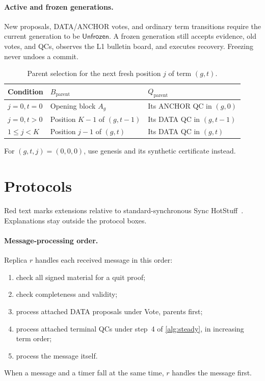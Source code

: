 \documentclass[11pt,a4paper]{article}
\newcommand{\RR}[1]{{\color{rrRed}#1}}
\newcommand{\tagg}[1]{\ensuremath{\mathsf{#1}}}
\newcounter{protocol}
\begin{document}
\paragraph{Active and frozen generations.}
New proposals, DATA/ANCHOR votes, and ordinary term transitions require
the current generation to be \tagg{Unfrozen}. A frozen generation still
accepts evidence, old votes, and QCs, observes the L1 bulletin board, and
executes recovery. Freezing never undoes a commit.

\begin{table}[htbp]\centering\small
\caption{Parent selection for the next fresh position $j$ of term $(g,t)$.}
\label{tab:parent}
\begin{tabularx}{\linewidth}{@{}l Y Y@{}}
\toprule
Condition & $B_{\mathrm{parent}}$ & $Q_{\mathrm{parent}}$\\
\midrule
$j=0,t=0$ & Opening block $A_g$ & Its ANCHOR QC in $(g,0)$\\
$j=0,t>0$ & Position $K-1$ of $(g,t-1)$ & Its DATA QC in $(g,t-1)$\\
$1\le j<K$ & Position $j-1$ of $(g,t)$ & Its DATA QC in $(g,t)$\\
\bottomrule
\end{tabularx}
\smallskip
For $(g,t,j)=(0,0,0)$, use genesis and its synthetic certificate instead.
\end{table}

\section{Protocols}
\label{sec:protocols}
\RR{Red text} marks extensions relative to standard-synchronous
Sync HotStuff~\cite{sync}. Explanations stay outside the protocol
boxes.

\paragraph{Message-processing order.}
Replica $r$ handles each received message in this order:
\begin{enumerate}[label=(\arabic*)]
\item check all signed material for a quit proof;
\item check completeness and validity;
\item process attached DATA proposals under Vote, parents first;
\item process attached terminal QCs under step~4 of \cref{alg:steady}, in
increasing term order;
\item process the message itself.
\end{enumerate}
When a message and a timer fall at the same time, $r$ handles the message
first.
\end{document}
